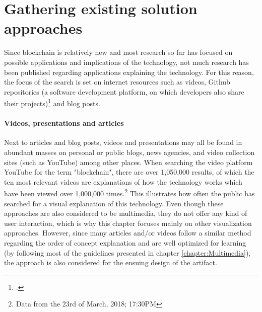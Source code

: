 \section{Gathering existing solution approaches} \label{sec:ExistingSolutions}

Since blockchain is relatively new and most research so far has focused on possible applications and implications of the technology, not much research has been published regarding applications explaining the technology. For this reason, the focus of the search is set on internet resources such as videos, Github repositories (a software development platform, on which developers also share their projects)\footcite[Cf.][]{GithubHowdevelopers} and blog posts. 

\paragraph{Videos, presentations and articles} Next to articles and blog posts, videos and presentations may all be found in abundant masses on personal or public blogs, news agencies, and video collection sites (such as YouTube) among other places. When searching the video platform YouTube for the term "blockchain", there are over 1,050,000 results, of which the ten most relevant videos are explanations of how the technology works which have been viewed over 1,000,000 times.\footnote{Data from the 23rd of March, 2018; 17:30PM} This illustrates how often the public has searched for a visual explanation of this technology. Even though these approaches are also considered to be multimedia, they do not offer any kind of user interaction, which is why this chapter focuses mainly on other visualization approaches. However, since many articles and/or videos follow a similar method regarding the order of concept explanation and are well optimized for learning (by following most of the guidelines presented in chapter \ref{chapter:Multimedia}), the approach is also considered for the ensuing design of the artifact.

